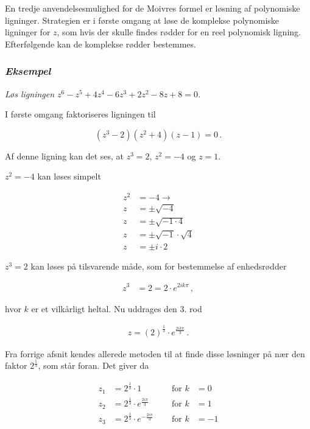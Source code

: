\documentclass[a4paper, 12pt,titlepage]{article}
\begin{document}
En tredje anvendelsesmulighed for de Moivres formel er løsning af polynomiske ligninger. Strategien er i første omgang at løse de komplekse polynomiske ligninger for \(z\), som hvis der skulle findes rødder for en reel polynomisk ligning. Efterfølgende kan de komplekse rødder bestemmes.

\subsubsection*{\emph{Eksempel}}
\label{sec:orgcee8e77}
\emph{Løs ligningen \(z^6-z^5+4z^4-6z^3+2z^2-8z+8=0\).}

I første omgang faktoriseres ligningen til

$$\left(z^3-2\right) \left(z^2+4\right) \left(z-1\right) =0 \,.$$

Af denne ligning kan det ses, at \(z^3=2\), \(z^2=-4\) og \(z=1\).

\(z^2=-4\) kan løses simpelt

\begin{align*}
    z^2 &= -4 \to \\
    z &= \pm \sqrt{-4} \\
    z &= \pm \sqrt{-1 \cdot 4} \\
    z &= \pm \sqrt{-1} \cdot \sqrt{4} \\
    z &= \pm i \cdot 2
\end{align*}

\(z^3 =2\) kan løses på tilsvarende måde, som for bestemmelse af enhedsrødder

\begin{align*}
    z^3 &=2 =2 \cdot e^{2 i k \pi} \, ,
\end{align*}

hvor \(k\) er et vilkårligt heltal. Nu uddrages den 3. rod

\begin{align*}
    z = \left(2\right)^{\frac{1}{3}} \cdot e^{\frac{2 i k \pi}{3}} \,.
\end{align*}

Fra forrige afsnit kendes allerede metoden til at finde disse løsninger på nær den faktor \(2^\frac{1}{3}\), som står foran. Det giver da

\begin{align*}
    z_1 &= 2^{\frac{1}{3}} \cdot 1 \quad &\text{ for } k&=0 \\
    z_2 &= 2^{\frac{1}{3}} \cdot e^{\frac{2 i \pi}{3}} \quad &\text{ for } k&=1\\
    z_3 &= 2^{\frac{1}{3}} \cdot e^{-\frac{2 i \pi}{3}} \quad &\text{ for } k&=-1
\end{align*}
\end{document}
